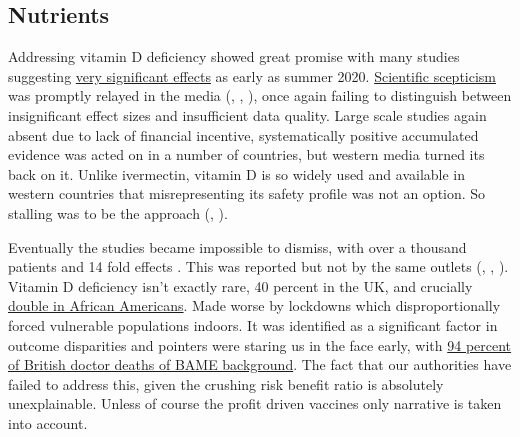 \documentclass[11pt,a4paper,notitlepage]{report}
\begin{document}
\subsection*{Nutrients}

Addressing vitamin D deficiency showed great promise with many studies suggesting \href{https://c19vitamind.com/}{very significant effects} as early as summer 2020. \href{https://www.nice.org.uk/guidance/ng187}{Scientific scepticism} was promptly relayed in the media (\cite{guardian29062020}, \cite{guardian29032021}, \cite{bbc17112020}), once again failing to distinguish between insignificant effect sizes and insufficient data quality. Large scale studies again absent due to lack of financial incentive, systematically positive accumulated evidence was acted on in a number of countries, but western media turned its back on it. Unlike ivermectin, vitamin D is so widely used and available in western countries that misrepresenting its safety profile was not an option. So stalling was to be the approach (\cite{bbc05042021}, \cite{guardian29022021}). 

Eventually the studies became impossible to dismiss, with over a thousand patients and 14 fold effects \cite{10.1371/journal.pone.0263069}. This was reported but not by the same outlets (\cite{timesofisrael03022022}, \cite{dailymail08022022}, \cite{hindustantimes14022022}). Vitamin D deficiency isn't exactly rare, 40 percent in the UK, and crucially \href{https://www.cooperinstitute.org/2019/09/24/african-americans-at-greatest-risk-of-vitamin-d-deficiency}{double in African Americans}. Made worse by lockdowns which disproportionally forced vulnerable populations indoors. It was identified as a significant factor in outcome disparities \cite{Ames2021-sf} and pointers were staring us in the face early, with \href{https://twitter.com/TheBMA/status/1271768163630428160?s=20}{94 percent of British doctor deaths of BAME background}. The fact that our authorities have failed to address this, given the crushing risk benefit ratio is absolutely unexplainable. Unless of course the profit driven vaccines only narrative is taken into account.


\end{document}
